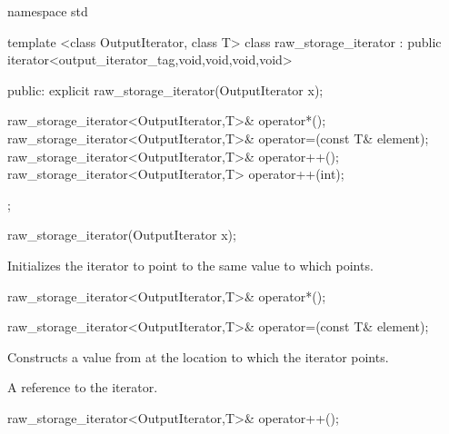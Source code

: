 \begin{codeblock}
namespace std {
  template <class OutputIterator, class T>
  class raw_storage_iterator
    : public iterator<output_iterator_tag,void,void,void,void> {
  public:
    explicit raw_storage_iterator(OutputIterator x);

    raw_storage_iterator<OutputIterator,T>& operator*();
    raw_storage_iterator<OutputIterator,T>& operator=(const T& element);
    raw_storage_iterator<OutputIterator,T>& operator++();
    raw_storage_iterator<OutputIterator,T>  operator++(int);
  };
}
\end{codeblock}

%
\begin{itemdecl}
raw_storage_iterator(OutputIterator x);
\end{itemdecl}

\begin{itemdescr}
\pnum
\effects
Initializes the iterator to point to the same value to which  points.
\end{itemdescr}

\begin{itemdecl}
raw_storage_iterator<OutputIterator,T>& operator*();
\end{itemdecl}

\begin{itemdescr}
\pnum
\returns
{}
\end{itemdescr}

\begin{itemdecl}
raw_storage_iterator<OutputIterator,T>& operator=(const T& element);
\end{itemdecl}

\begin{itemdescr}
\pnum
\effects
Constructs a value from  at the location to which the iterator points.

\pnum
\returns
A reference to the iterator.
\end{itemdescr}

\begin{itemdecl}
raw_storage_iterator<OutputIterator,T>& operator++();
\end{itemdecl}

